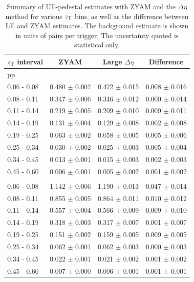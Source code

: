 \begin{table}
   \centering
      \caption{Summary of UE-pedestal estimates with ZYAM and the $\Delta\eta$ method for various $z_{\mathrm{T}}$ bins, as well as the difference between LE and ZYAM estimates. The background estimate is shown in units of pairs per trigger. The uncertainty quoted is statistical only.}
   \begin{tabular*}{1.0\columnwidth}{@{\extracolsep{\fill}}lccc@{}}
    \hline
		$z_\mathrm{T}$ interval & ZYAM  & Large $\Delta\eta$ & Difference\\
		\hline
		pp & & \\
		\hline
0.06 - 0.08 & 0.480 $\pm$ 0.007 & 0.472 $\pm$ 0.015 & 0.008 $\pm$ 0.016\\
0.08 - 0.11 & 0.347 $\pm$ 0.006 & 0.346 $\pm$ 0.012 & 0.000 $\pm$ 0.014\\
0.11 - 0.14 & 0.219 $\pm$ 0.005 & 0.209 $\pm$ 0.010 & 0.009 $\pm$ 0.011\\
0.14 - 0.19 & 0.131 $\pm$ 0.004 & 0.129 $\pm$ 0.008 & 0.002 $\pm$ 0.008\\
0.19 - 0.25 & 0.063 $\pm$ 0.002 & 0.058 $\pm$ 0.005 & 0.005 $\pm$ 0.006\\
0.25 - 0.34 & 0.030 $\pm$ 0.002 & 0.025 $\pm$ 0.003 & 0.005 $\pm$ 0.004\\
0.34 - 0.45 & 0.013 $\pm$ 0.001 & 0.015 $\pm$ 0.003 & 0.002 $\pm$ 0.003\\
0.45 - 0.60 & 0.006 $\pm$ 0.001 & 0.005 $\pm$ 0.002 & 0.001 $\pm$ 0.002\\
	\hline 
	\pPb & & \\
	\hline
0.06 - 0.08 & 1.142 $\pm$ 0.006 & 1.190 $\pm$ 0.013 & 0.047 $\pm$ 0.014\\
0.08 - 0.11 & 0.855 $\pm$ 0.005 & 0.864 $\pm$ 0.011 & 0.010 $\pm$ 0.012\\
0.11 - 0.14 & 0.557 $\pm$ 0.004 & 0.566 $\pm$ 0.009 & 0.009 $\pm$ 0.010\\
0.14 - 0.19 & 0.318 $\pm$ 0.003 & 0.317 $\pm$ 0.007 & 0.001 $\pm$ 0.007\\
0.19 - 0.25 & 0.151 $\pm$ 0.002 & 0.159 $\pm$ 0.005 & 0.009 $\pm$ 0.005\\
0.25 - 0.34 & 0.062 $\pm$ 0.001 & 0.062 $\pm$ 0.003 & 0.000 $\pm$ 0.003\\
0.34 - 0.45 & 0.022 $\pm$ 0.001 & 0.021 $\pm$ 0.002 & 0.001 $\pm$ 0.002\\
0.45 - 0.60 & 0.007 $\pm$ 0.000 & 0.006 $\pm$ 0.001 & 0.001 $\pm$ 0.001\\

   \end{tabular*}
   \label{tab:UE_Average}
\end{table}


